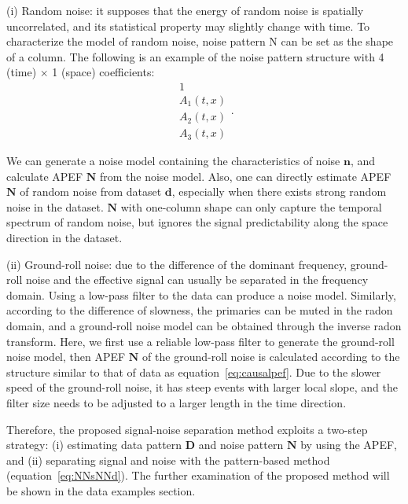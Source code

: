(i) Random noise: it supposes that the energy of random noise is spatially
uncorrelated, and its statistical property may slightly change with time.
To characterize the model of random noise, noise pattern N can be set as the
shape of a column. The following is an example of the noise pattern structure
with 4 (time) $\times$ 1 (space) coefficients:
\begin{equation}
    \begin{array}{c}
        1          \\
        A_{1}(t,x) \\
        A_{2}(t,x) \\
        A_{3}(t,x)
    \end{array} .
    \label{eqn:noizpef1}
\end{equation}

We can generate a noise model containing the characteristics of noise $\mathbf{n}$,
and calculate APEF $\mathbf{N}$ from the noise model. Also, one can directly
estimate APEF $\mathbf{N}$ of random noise from dataset $\mathbf{d}$, especially
when there exists strong random noise in the dataset. $\mathbf{N}$ with one-column
shape can only capture the temporal spectrum of random noise, but ignores the
signal predictability along the space direction in the dataset.

(ii) Ground-roll noise: due to the difference of the dominant frequency, ground-roll
noise and the effective signal can usually be separated in the frequency domain.
Using a low-pass filter to the data can produce a noise model. Similarly, according
to the difference of slowness, the primaries can be muted in the radon domain, and
a ground-roll noise model can be obtained through the inverse radon transform. Here,
we first use a reliable low-pass filter to generate the ground-roll noise model, then
APEF $\mathbf{N}$ of the ground-roll noise is calculated according to the structure
similar to that of data as equation~\ref{eq:causalpef}. Due to the slower speed of
the ground-roll noise, it has steep events with larger local slope, and the filter
size needs to be adjusted to a larger length in the time direction.

Therefore, the proposed signal-noise separation method exploits a two-step strategy:
(i) estimating data pattern $\mathbf{D}$ and noise pattern $\mathbf{N}$ by using
the APEF, and (ii) separating signal and noise with the pattern-based method
(equation~\ref{eq:NNsNNd}). The further examination of the proposed method will
be shown in the data examples section.

